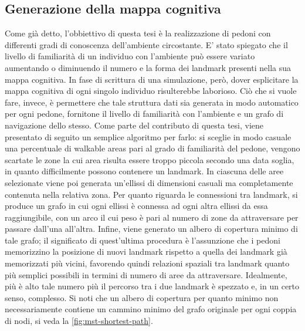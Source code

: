\documentclass[12pt,a4paper,openright,oneside]{book}
\begin{document}
\subsection{Generazione della mappa cognitiva}
\label{automatic-generation-cognitive-map}
Come già detto, l'obbiettivo di questa tesi è la realizzazione di pedoni con differenti gradi di conoscenza dell'ambiente circostante. E' stato spiegato che il livello di familiarità di un individuo con l'ambiente può essere variato aumentando o diminuendo il numero e la forma dei landmark presenti nella sua mappa cognitiva. In fase di scrittura di una simulazione, però, dover esplicitare la mappa cognitiva di ogni singolo individuo risulterebbe laborioso. Ciò che si vuole fare, invece, è permettere che tale struttura dati sia generata in modo automatico per ogni pedone, fornitone il livello di familiarità con l'ambiente e un grafo di navigazione dello stesso. Come parte del contributo di questa tesi, viene presentato di seguito un semplice algoritmo per farlo: si sceglie in modo casuale una percentuale di walkable areas pari al grado di familiarità del pedone, vengono scartate le zone la cui area risulta essere troppo piccola secondo una data soglia, in quanto difficilmente possono contenere un landmark. In ciascuna delle aree selezionate viene poi generata un'ellissi di dimensioni casuali ma completamente contenuta nella relativa zona. Per quanto riguarda le connessioni tra landmark, si produce un grafo in cui ogni ellissi è connessa ad ogni altra ellissi da essa raggiungibile, con un arco il cui peso è pari al numero di zone da attraversare per passare dall'una all'altra. Infine, viene generato un albero di copertura minimo di tale grafo; il significato di quest'ultima procedura è l'assunzione che i pedoni memorizzino la posizione di nuovi landmark rispetto a quella dei landmark già memorizzati più vicini, favorendo quindi relazioni spaziali tra landmark quanto più semplici possibili in termini di numero di aree da attraversare. Idealmente, più è alto tale numero più il percorso tra i due landmark è spezzato e, in un certo senso, complesso. Si noti che un albero di copertura per quanto minimo non necessariamente contiene un cammino minimo del grafo originale per ogni coppia di nodi, si veda la \cref{fig:mst-shortest-path}.
\end{document}
